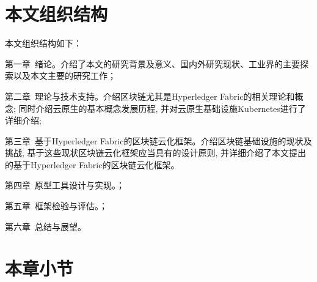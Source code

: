 



\section{本文组织结构}

本文组织结构如下：

第一章~绪论。介绍了本文的研究背景及意义、国内外研究现状、工业界的主要探索以及本文主要的研究工作；

第二章~理论与技术支持。介绍区块链尤其是Hyperledger Fabric的相关理论和概念; 同时介绍云原生的基本概念发展历程, 并对云原生基础设施Kubernetes进行了详细介绍;

第三章~基于Hyperledger Fabric的区块链云化框架。介绍区块链基础设施的现状及挑战, 基于这些现状区块链云化框架应当具有的设计原则, 并详细介绍了本文提出的基于Hyperledger Fabric的区块链云化框架。

第四章~原型工具设计与实现。；

第五章~框架检验与评估。；

第六章~总结与展望。

\section{本章小节}
